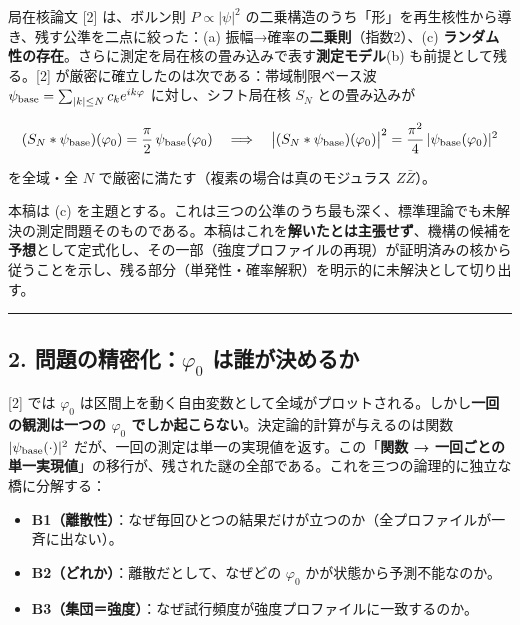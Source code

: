 \documentclass[
]{ltjsarticle}
\providecommand{\tightlist}{%
  \setlength{\itemsep}{0pt}\setlength{\parskip}{0pt}}
\begin{document}
局在核論文 {[}2{]} は、ボルン則 \(P\propto|\psi|^2\)
の二乗構造のうち「形」を再生核性から導き、残す公準を二点に絞った：(a)
振幅→確率の\textbf{二乗則}（指数2）、(c)
\textbf{ランダム性の存在}。さらに測定を局在核の畳み込みで表す\textbf{測定モデル}(b)
も前提として残る。{[}2{]} が厳密に確立したのは次である：帯域制限ベース波
\(\psi_{\rm base}=\sum_{|k|\le N}c_k e^{ik\varphi}\)
に対し、シフト局在核 \(S_N\) との畳み込みが

\[
(S_N*\psi_{\rm base})(\varphi_0)=\frac{\pi}{2}\,\psi_{\rm base}(\varphi_0)
\quad\Longrightarrow\quad
\big|(S_N*\psi_{\rm base})(\varphi_0)\big|^2=\frac{\pi^2}{4}\,|\psi_{\rm base}(\varphi_0)|^2
\]

を全域・全 \(N\) で厳密に満たす（複素の場合は真のモジュラス
\(Z\bar Z\)）。

本稿は (c)
を主題とする。これは三つの公準のうち最も深く、標準理論でも未解決の測定問題そのものである。本稿はこれを\textbf{解いたとは主張せず}、機構の候補を\textbf{予想}として定式化し、その一部（強度プロファイルの再現）が証明済みの核から従うことを示し、残る部分（単発性・確率解釈）を明示的に未解決として切り出す。

\begin{center}\rule{0.5\linewidth}{0.5pt}\end{center}

\subsection{\texorpdfstring{2. 問題の精密化：\(\varphi_0\)
は誰が決めるか}{2. 問題の精密化：\textbackslash varphi\_0 は誰が決めるか}}\label{ux554fux984cux306eux7cbeux5bc6ux5316varphi_0-ux306fux8ab0ux304cux6c7aux3081ux308bux304b}

{[}2{]} では \(\varphi_0\)
は区間上を動く自由変数として全域がプロットされる。しかし\textbf{一回の観測は一つの
\(\varphi_0\) でしか起こらない}。決定論的計算が与えるのは関数
\(|\psi_{\rm base}(\cdot)|^2\)
だが、一回の測定は単一の実現値を返す。この「\textbf{関数 →
一回ごとの単一実現値}」の移行が、残された謎の全部である。これを三つの論理的に独立な橋に分解する：

\begin{itemize}
\tightlist
\item
  \textbf{B1（離散性）}：なぜ毎回ひとつの結果だけが立つのか（全プロファイルが一斉に出ない）。
\item
  \textbf{B2（どれか）}：離散だとして、なぜどの \(\varphi_0\)
  かが状態から予測不能なのか。
\item
  \textbf{B3（集団＝強度）}：なぜ試行頻度が強度プロファイルに一致するのか。
\end{itemize}
\end{document}
